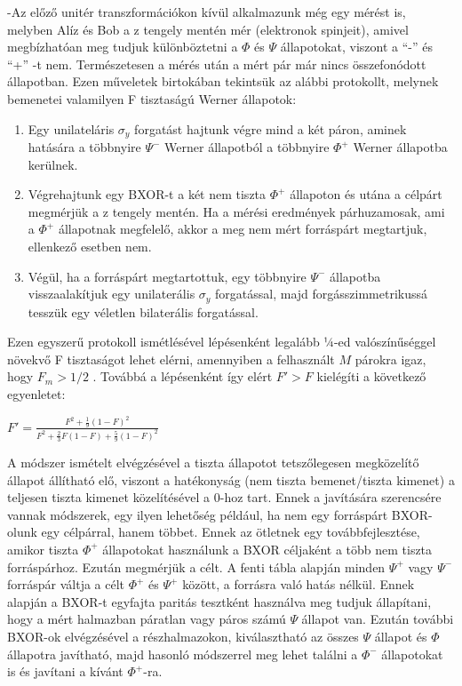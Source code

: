 -Az előző unitér transzformációkon kívül alkalmazunk még egy mérést is, melyben Alíz és Bob a z tengely mentén mér (elektronok spinjeit), amivel megbízhatóan meg tudjuk különböztetni a $\Phi$ és $\Psi$ állapotokat, viszont a ``-'' és ``+'' -t nem. Természetesen a mérés után a mért pár már nincs összefonódott állapotban.
Ezen műveletek birtokában tekintsük az alábbi protokollt, melynek bemenetei valamilyen F tisztaságú Werner állapotok:
\begin{enumerate}
\item Egy unilateláris $\sigma_y$ forgatást hajtunk végre mind a két páron, aminek hatására a többnyire $\Psi^-$ Werner állapotból a többnyire $\Phi^+$ Werner állapotba kerülnek.
\item Végrehajtunk egy  BXOR-t a két nem tiszta $\Phi^+$ állapoton és utána a célpárt megmérjük a z tengely mentén. Ha a mérési eredmények párhuzamosak, ami a $\Phi^+$ állapotnak megfelelő, akkor a meg nem mért forráspárt  megtartjuk, ellenkező esetben nem.
\item Végül, ha a forráspárt megtartottuk, egy többnyire $\Psi^-$ állapotba visszaalakítjuk egy unilaterális $\sigma_y$ forgatással, majd forgásszimmetrikussá tesszük egy véletlen bilaterális forgatással.
\end{enumerate}
Ezen egyszerű protokoll ismétlésével lépésenként legalább ¼-ed valószínűséggel növekvő F tisztaságot lehet elérni, amennyiben a felhasznált $M$ párokra igaz, hogy
$F_m > 1/2$  . Továbbá a lépésenként így elért $F'>F$ kielégíti a következő egyenletet:\\
\begin{center}
$F' = \frac{F^2 + \frac{1}{9}(1-F)^2}{F^2 + \frac{2}{3}F(1-F) + \frac{5}{9}(1-F)^2} $
\end{center}
A módszer ismételt elvégzésével a tiszta állapotot tetszőlegesen megközelítő állapot állítható elő, viszont a hatékonyság (nem tiszta bemenet/tiszta kimenet)  a teljesen tiszta kimenet közelítésével a 0-hoz tart. Ennek a javítására szerencsére vannak módszerek, egy ilyen lehetőség például, ha nem egy forráspárt BXOR-olunk egy célpárral, hanem többet. Ennek az ötletnek egy továbbfejlesztése, amikor tiszta $\Phi^+$  állapotokat használunk a BXOR céljaként a több nem tiszta forráspárhoz. Ezután megmérjük a célt. A fenti tábla alapján minden $\Psi^+$ vagy $\Psi^-$ forráspár váltja a célt $\Phi^+$ és $\Psi^+$ között, a forrásra való hatás nélkül. Ennek alapján a BXOR-t egyfajta paritás tesztként használva meg tudjuk állapítani, hogy a mért halmazban páratlan vagy páros számú $\Psi$ állapot van. Ezután további BXOR-ok elvégzésével a részhalmazokon, kiválasztható az összes $\Psi$ állapot és $\Phi$ állapotra javítható, majd hasonló módszerrel meg lehet találni a $\Phi^-$ állapotokat is és javítani a kívánt $\Phi^+$-ra.\\
